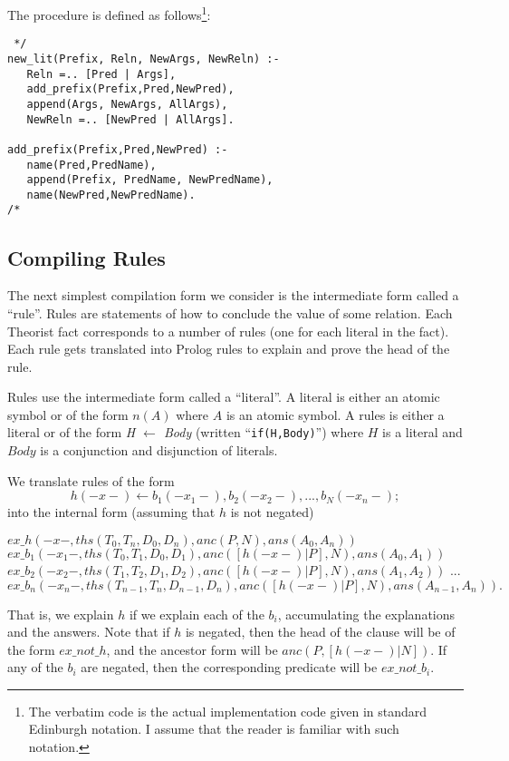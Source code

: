 The procedure is defined as follows\footnote{The verbatim code
is the actual implementation code given in standard Edinburgh notation.
I assume that the reader is familiar with such notation.}:
\begin{verbatim} */
new_lit(Prefix, Reln, NewArgs, NewReln) :-
   Reln =.. [Pred | Args],
   add_prefix(Prefix,Pred,NewPred),
   append(Args, NewArgs, AllArgs),
   NewReln =.. [NewPred | AllArgs].

add_prefix(Prefix,Pred,NewPred) :-
   name(Pred,PredName),
   append(Prefix, PredName, NewPredName),
   name(NewPred,NewPredName).
/* \end{verbatim}
\subsection{Compiling Rules}
The next simplest compilation form we consider is the intermediate form
called a ``rule''.
Rules are statements of how to conclude
the value of some relation. Each Theorist fact corresponds to a number
of rules (one for each literal in the fact).
Each rule gets translated into Prolog rules to explain
and prove the head of the rule. 

Rules use the intermediate form called a ``literal''.
A literal is either an atomic symbol or of the form $n(A)$ where $A$ is
an atomic symbol.
A rules is either a literal or
of the form {\em H $\leftarrow$ Body} (written ``{\tt if(H,Body)}'')
where $H$ is a literal
and $Body$ is a conjunction and disjunction of literals.

We translate rules of the form
\[h(-x-) \leftarrow b_1(-x_1-), b_2(-x_2-), ... ,b_N(-x_n-);\]
into the internal form (assuming that $h$ is not negated)
\begin{prolog}
$ex\_h(-x-,ths(T_0,T_n,D_0,D_n), anc(P,N), ans(A_0,A_n)) $\IF
$ex\_b_1(-x_1-,ths(T_0,T_1,D_0,D_1), anc([h(-x-)|P],N), ans(A_0,A_1))$\AND
$ex\_b_2(-x_2-,ths(T_1,T_2,D_1,D_2), anc([h(-x-)|P],N), ans(A_1,A_2))$\AND
$...$\AND
$ex\_b_n(-x_n-,ths(T_{n-1},T_n,D_{n-1},D_n), anc([h(-x-)|P],N),
ans(A_{n-1},A_n)).$
\end{prolog}
That is, we explain $h$ if we explain each of the $b_i$,
accumulating the explanations and the answers.
Note that if $h$ is negated, then the head of the clause will be of
the form $ex\_not\_h$, and the ancestor form will be
$anc(P,[h(-x-)|N])$. If any of the $b_i$ are negated, then the
corresponding predicate will be $ex\_not\_b_i$.

